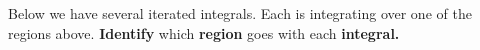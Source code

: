 \documentclass{ximera}
\begin{document}
\begin{problem}
\begin{center}
  \end{center}
  Below we have several iterated integrals. Each is integrating over one
  of the regions above. \textbf{Identify} which \textbf{region} goes with each \textbf{integral.}

\end{problem}
\end{document}
